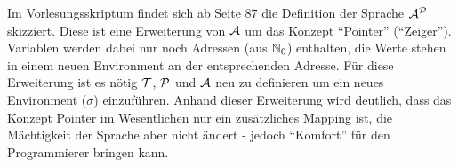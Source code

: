 {\begin{comment}
\begin{align*}
&\quad \Iu{A}{\omega^\ell}{\tu{while \tneg eq?(y,null) do} \; Z_{4,5,6,7}} \\
\intertext{\textcolor{darkblue}{NR: $\I{P}{\omega^{\ell}}{\tneg eq?(y,null)}
=\tneg \I{P}{\omega^{\ell}}{eq?(y,null)}$\newline$
=\tneg \text{eq?}\rbr{\I{T}{\omega^{1}}{y},\I{T}{\omega^{\ell}}{null}}
=\tneg \text{eq?}\rbr{\omega^{\ell}(\tu{y}),0}
=\tneg \text{eq?}\rbr{n+1,0}
=\tneg F
=T$}}
&= \Iu{A}{\I{A}{\omega^{\ell}}{begin z := plus(z,x) ; y := minus(y,eins) end}}{Z_{3,\ldots,7}} \\
&= \Iu{A}{\I{A}{\I{A}{\omega^{\ell}}{z := plus(z,x)}}{y := minus(y,eins)}}{Z_{3,\ldots,7}} \\
\intertext{\textcolor{darkblue}{NE: $\omega^{\ell+1} \sim_{\tu{z}} \omega^{\ell}$ und berechnen
$\omega^{\ell+1}(\tu{z})
=\I{T}{\omega^{\ell}}{plus(z,x)}$\newline$
=\text{plus}(\I{T}{\omega^{\ell}}{z},\I{T}{\omega^{1}}{x})
=\text{plus}(\omega^{\ell}(\u{z}),\omega^{1}(\u{x}))
=\text{plus}(p,m)
=p+m$}}
&= \Iu{A}{\I{A}{\omega^{\ell+1}}{y := minus(y,eins)}}{Z_{3,\ldots,7}} \\
\intertext{\textcolor{darkblue}{NE: $\omega^{\ell+2} \sim_{\tu{y}} \omega^{\ell+1}$ und berechnen
$\omega^{\ell+2}(\tu{y})
=\I{T}{\omega^{\ell+1}}{minus(y,eins)}$\newline$
=\text{minus}(\I{T}{\omega^{\ell+1}}{y},\I{T}{\omega^{\ell+1}}{eins})
=\text{minus}(\omega^{\ell+1}(\u{y}),1)
=\text{minus}(n+1,1)
=n$}}
&= \Iu{A}{\omega^{\ell+2}}{Z_{3,\ldots,7}} \\
\intertext{Wir sehen, dass für $\omega^{\ell+2}$ die Induktionshypothese gilt und verwenden diese:}
&= \omega^k \\
\omega^k(\tu{z}) &= \omega^{\ell+2}(\tu{x}) \cdot \omega^{\ell+2}(\tu{y}) + \omega^{\ell+2}(\tu{z}) \\
&= m \cdot n + (p+m) \\
&= (m+1) \cdot n + p
\end{align*}
Und damit ist auch die Schleife bewiesen. Das Programm ist also korrekt.\hfill$\Box$
\end{\whichitem}
\end{bsp}
\ifthenelse{\boolean{long}}{}{\end{comment}}

Im Vorlesungsskriptum findet sich ab Seite 87 die Definition der Sprache $\mathcal{A^P}$ skizziert.
Diese ist eine Erweiterung von $\mathcal{A}$ um das Konzept ``Pointer'' (``Zeiger'').
Variablen werden dabei nur noch Adressen (aus $\mathbb{N}_0$) enthalten, die Werte stehen in einem neuen
Environment an der entsprechenden Adresse.
Für diese Erweiterung ist es nötig $\mathcal{T}$, $\mathcal{P}$ und $\mathcal{A}$ neu zu definieren um ein
neues Environment ($\sigma$) einzuführen.
Anhand dieser Erweiterung wird deutlich, dass das Konzept Pointer im Wesentlichen nur ein zusätzliches Mapping ist,
die Mächtigkeit der Sprache aber nicht ändert - jedoch ``Komfort'' für den Programmierer bringen kann.


